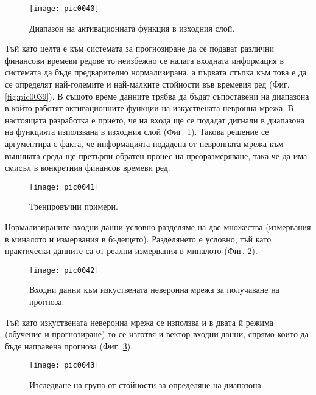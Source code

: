 \begin{figure}[h]
  \centering
  \texttt{[image: pic0040]}
  \caption{Диапазон на активационната функция в изходния слой.}
\label{fig:pic0040}
\end{figure}
\FloatBarrier

Тъй като целта е към системата за прогнозиране да се подават различни финансови времеви редове то неизбежно се налага входната информация в системата да бъде предварително нормализирана, а първата стъпка към това е да се определят най-големите и най-малките стойности във времевия ред (Фиг. \ref{fig:pic0039}). В същото време данните трябва да бъдат съпоставени на диапазона в който работят активационните функции на изкуствената невронна мрежа. В настоящата разработка е прието, че на входа ще се подадат дигнали в диапазона на функцията използвана в изходния слой (Фиг. \ref{fig:pic0040}). Такова решение се аргументира с факта, че информацията подадена от невронната мрежа към външната среда ще претърпи обратен процес на преоразмеряване, така че да има смисъл в конкретния финансов времеви ред.

\begin{figure}[h]
  \centering
  \texttt{[image: pic0041]}
  \caption{Тренировъчни примери.}
\label{fig:pic0041}
\end{figure}
\FloatBarrier

Нормализираните входни данни условно разделяме на две множества (измервания в миналото и измервания в бъдещето). Разделянето е условно, тъй като практически данните са от реални измервания в миналото (Фиг. \ref{fig:pic0041}).

\begin{figure}[h]
  \centering
  \texttt{[image: pic0042]}
  \caption{Входни данни към изкуствената неверонна мрежа за получаване на прогноза.}
\label{fig:pic0042}
\end{figure}
\FloatBarrier

Тъй като изкуствената неверонна мрежа се използва и в двата й режима (обучение и прогнозиране) то се изготвя и вектор входни данни, спрямо които да бъде направена прогноза (Фиг. \ref{fig:pic0042}).

\begin{figure}[h]
  \centering
  \texttt{[image: pic0043]}
  \caption{Изследване на група от стойности за определяне на диапазона.}
\label{fig:pic0043}
\end{figure}
\FloatBarrier

